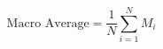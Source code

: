 \begin{equation}
  \label{eqn:macro_avg}
  \text{Macro Average} = \frac{1}{N} \sum_{i=1}^{N} M_i
\end{equation}

